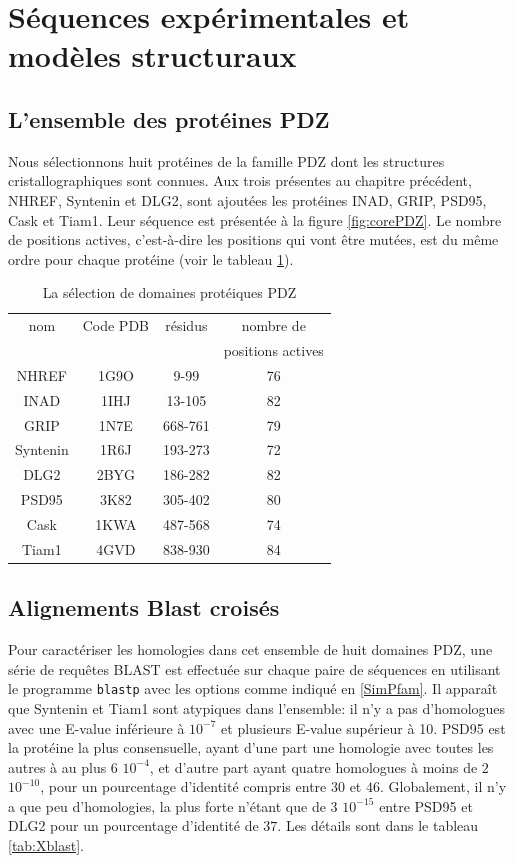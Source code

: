 \section{Séquences expérimentales et modèles structuraux}
\subsection{L'ensemble des protéines PDZ}
Nous sélectionnons huit protéines de la famille PDZ dont les structures cristallographiques sont connues. Aux trois présentes au chapitre précédent, NHREF, Syntenin et DLG2, sont ajoutées les protéines INAD, GRIP, PSD95, Cask et Tiam1. Leur séquence est présentée à la figure \ref{fig:corePDZ}. Le nombre de positions actives, c'est-à-dire les positions qui vont être mutées, est du même ordre pour chaque protéine (voir le tableau \ref{tab:protéines_PDZ}).

\begin{table}[!htbp]
  \centering
  \caption{La sélection de domaines protéiques PDZ}
  \begin{tabular}{cccc}
    \toprule
    nom & Code PDB & résidus &  nombre de \\
        &          &         & positions actives \\
    \cmidrule{1-4}
    NHREF    & 1G9O  & 9-99    & 76 \\
    INAD     & 1IHJ  & 13-105  & 82 \\
    GRIP     & 1N7E  & 668-761 & 79 \\
    Syntenin & 1R6J  & 193-273 & 72 \\
    DLG2     & 2BYG  & 186-282 & 82 \\
    PSD95    & 3K82  & 305-402 & 80 \\
    Cask     & 1KWA  & 487-568 & 74 \\
    Tiam1    & 4GVD  & 838-930 & 84 \\
    \bottomrule
    
  \end{tabular}      
  \label{tab:protéines_PDZ}      
\end{table}

\subsection{Alignements Blast croisés}
   
Pour caractériser les homologies dans cet ensemble de huit domaines PDZ, une série de requêtes BLAST est effectuée sur chaque paire de séquences en utilisant le programme \verb!blastp! avec les options comme indiqué en \ref{SimPfam}. Il apparaît que Syntenin et Tiam1 sont atypiques dans l'ensemble: il n'y a pas d'homologues avec une E-value inférieure à $10^{-7}$ et plusieurs E-value supérieur à 10. PSD95 est la protéine la plus consensuelle, ayant d'une part une homologie avec toutes les autres à au plus $6$ $10^{-4}$, et d'autre part ayant quatre homologues à moins de $2$ $10^{-10}$, pour un pourcentage d'identité compris entre $30$ et $46$. Globalement, il n'y a que peu d'homologies, la plus forte n'étant que de $3$ $10^{-15}$ entre PSD95 et DLG2 pour un pourcentage d'identité de $37$. Les détails sont dans le tableau \ref{tab:Xblast}.

